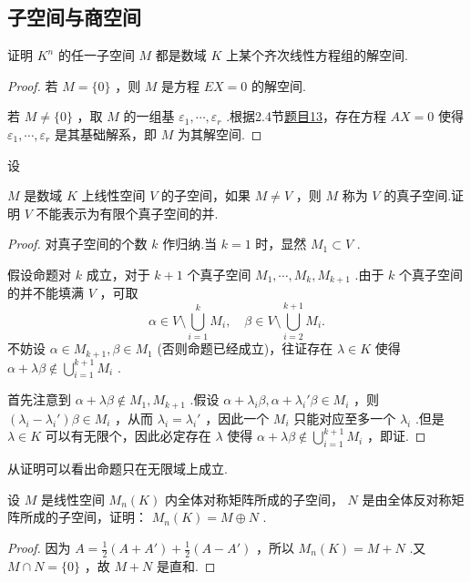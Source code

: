 \subsection{子空间与商空间}
\begin{prob}[7]
	证明 $K^n$ 的任一子空间 $M$ 都是数域 $K$ 上某个齐次线性方程组的解空间.
\end{prob}
\begin{proof}
	若 $M=\{0\}$ ，则 $M$ 是方程 $EX=0$ 的解空间.

	若 $M\ne\{0\}$ ，取 $M$ 的一组基 $\varepsilon_1,\cdots,\varepsilon_r$ .根据2.4节\hyperlink{EquationForCertainVectors}{题目13}，存在方程 $AX=0$ 使得 $\varepsilon_1,\cdots,\varepsilon_r$ 是其基础解系，即 $M$ 为其解空间.
\end{proof}
\begin{prob}[8]
	\hypertarget{FiniteSubspace}{设} $M$ 是数域 $K$ 上线性空间 $V$ 的子空间，如果 $M\ne V$ ，则 $M$ 称为 $V$ 的{\heiti 真子空间}.证明 $V$ 不能表示为有限个真子空间的并.
\end{prob}
\begin{proof}
	对真子空间的个数 $k$ 作归纳.当 $k=1$ 时，显然 $M_1\subset V$ .

	假设命题对 $k$ 成立，对于 $k+1$ 个真子空间 $M_1,\cdots,M_k,M_{k+1}$ .由于 $k$ 个真子空间的并不能填满 $V$ ，可取
	\[
		\alpha\in V\setminus\bigcup_{i=1}^{k}M_i,\quad \beta\in V\setminus\bigcup_{i=2}^{k+1}M_i.
	\]
	不妨设 $\alpha\in M_{k+1},\beta\in M_1$ (否则命题已经成立)，往证存在 $\lambda\in K$ 使得 $\alpha+\lambda\beta\notin\displaystyle \bigcup_{i=1}^{k+1}M_i$ .

	首先注意到 $\alpha+\lambda\beta\notin M_1,M_{k+1}$ .假设 $\alpha+\lambda_i\beta,\alpha+\lambda_i'\beta\in M_i$ ，则 $(\lambda_i-\lambda_i')\beta\in M_i$ ，从而 $\lambda_i=\lambda_i'$ ，因此一个 $M_i$ 只能对应至多一个 $\lambda_i$ .但是 $\lambda\in K$ 可以有无限个，因此必定存在 $\lambda$ 使得 $\alpha+\lambda\beta\notin\displaystyle \bigcup_{i=1}^{k+1}M_i$ ，即证.
\end{proof}
\begin{note}
	从证明可以看出命题只在无限域上成立.
\end{note}
\begin{prob}[16]
	设 $M$ 是线性空间 $M_n(K)$ 内全体对称矩阵所成的子空间， $N$ 是由全体反对称矩阵所成的子空间，证明： $M_n(K)=M\oplus N$ .
\end{prob}
\begin{proof}
	因为 $A=\frac{1}{2}(A+A')+\frac{1}{2}(A-A')$ ，所以 $M_n(K)=M+N$ .又 $M\cap N=\{0\}$ ，故 $M+N$ 是直和.
\end{proof}
